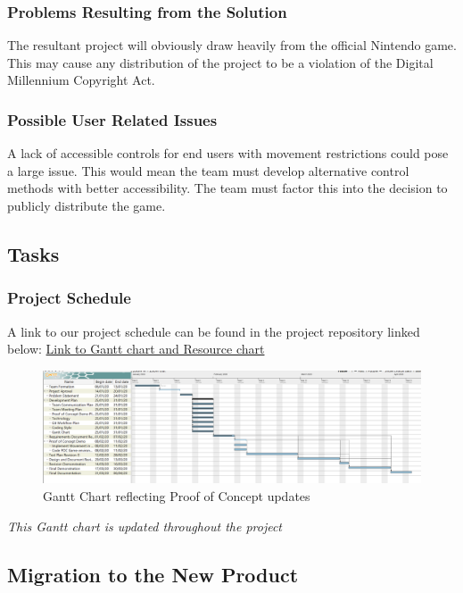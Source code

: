 \documentclass[12pt, titlepage]{article}
\begin{document}
\subsubsection{Problems Resulting from the Solution}
The resultant project will obviously draw heavily from the official Nintendo game. This may cause any distribution of the project to be a violation of the Digital Millennium Copyright Act.

\subsubsection{Possible User Related Issues}
A lack of accessible controls for end users with movement restrictions could pose a large issue. This would mean the team must develop alternative control methods with better accessibility. The team must factor this into the decision to publicly distribute the game.

\subsection{Tasks}
\subsubsection{Project Schedule}
A link to our project schedule can be found in the project repository linked below:
\href{https://gitlab.cas.mcmaster.ca/jandricd/super-refactored-mario-bros/tree/master/ProjectSchedule}{Link to Gantt chart and Resource chart}

\begin{figure}[H]
    \centering
    \includegraphics[width=\textwidth]{GanttChartSnapshotFeb9.png}
    \caption{Gantt Chart reflecting Proof of Concept updates}
    \label{fig:ganttchart}
\end{figure}

{\it This Gantt chart is updated throughout the project}

\subsection{Migration to the New Product}
\end{document}
